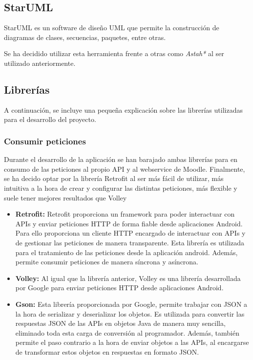 \subsection{StarUML}

StarUML es un software de diseño UML que permite la construcción de diagramas de clases, secuencias, paquetes, entre otras. \cite{wiki:staruml}

Se ha decidido utilizar esta herramienta frente a otras como \emph{Astah*} \cite{wiki:astah} al ser utilizado anteriormente.

\subsection{Librerías}

A continuación, se incluye una pequeña explicación sobre las librerías utilizadas para el desarrollo del proyecto.

\subsubsection{Consumir peticiones}

Durante el desarrollo de la aplicación se han barajado ambas librerías para en consumo de las peticiones al propio API y al webservice de Moodle. Finalmente, se ha decido optar por la librería Retrofit al ser más fácil de utilizar, más intuitiva a la hora de crear y configurar las distintas peticiones, más flexible y suele tener mejores resultados que Volley

\begin{itemize}

	\item \textbf{Retrofit:} Retrofit proporciona un framework para poder interactuar con APIs y enviar peticiones HTTP de forma fiable desde aplicaciones Android. Para ello proporciona un cliente HTTP encargado de interactuar con APIs y de gestionar las peticiones de manera transparente.
Esta librería es utilizada para el tratamiento de las peticiones desde la aplicación android. Además, permite consumir peticiones de manera síncrona y asíncrona. \cite{wiki:retrofit}
	
	\item \textbf{Volley:} Al igual que la librería anterior, Volley es una librería desarrollada por Google para enviar peticiones HTTP desde aplicaciones Android. \cite{wiki:volley}
	
	\item \textbf{Gson:} Esta librería proporcionada por Google, permite trabajar con JSON a la hora de serializar y deserializar los objetos. Es utilizada para convertir las respuestas JSON de las APIs en objetos Java de manera muy sencilla, eliminado toda esta carga de conversión al programador. Además, también permite el paso contrario a la hora de enviar objetos a las APIs, al encargarse de transformar estos objetos en respuestas en formato JSON. \cite{wiki:gson}

\end{itemize}

